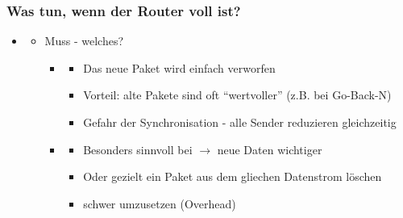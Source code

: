 \subsubsection*{Was tun, wenn der Router voll ist?}
\begin{itemize}
    \item {}
    \begin{itemize}
        \item Muss  - welches?
        \begin{itemize}
            \item {}
            \begin{itemize}
                \item Das neue Paket wird einfach verworfen
                \item Vorteil: alte Pakete sind oft \enquote{wertvoller} (z.B. bei Go-Back-N)
                \item {} Gefahr der Synchronisation - alle Sender reduzieren gleichzeitig
            \end{itemize}
            \item {}
            \begin{itemize}
                \item Besonders sinnvoll bei  $\rightarrow$ neue Daten wichtiger
                \item Oder gezielt ein Paket aus dem gliechen Datenstrom löschen
                \item {} schwer umzusetzen (Overhead)
            \end{itemize}
        \end{itemize}
    \end{itemize}
\end{itemize}

